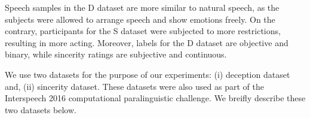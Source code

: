 \documentclass{article}
\begin{document}

Speech samples in the D dataset are more similar to natural speech, as the subjects were allowed to arrange speech and show emotions freely. On the contrary, participants for the S dataset were subjected to more restrictions, resulting in more acting. Moreover, labels for the D dataset are objective and binary, while sincerity ratings are subjective and continuous.\par

We use two datasets for the purpose of our experiments: (i) deception dataset and, (ii) sincerity dataset.
These datasets were also used as part of the Interspeech 2016 computational paralinguistic challenge.
We breifly describe these two datasets below.\\ 
\end{document}
